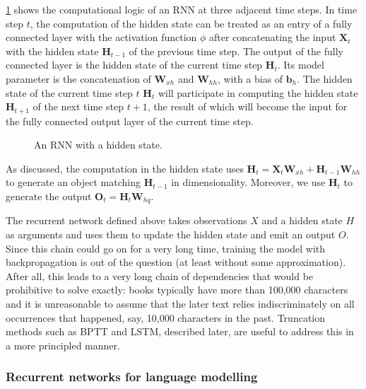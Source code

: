 \cref{fig:rnn} shows the computational logic of an RNN at three adjacent time steps. In time step $t$, the computation of the hidden state can be treated as an entry of a fully connected layer with the activation function $\phi$ after concatenating the input $\mathbf{X}_t$ with the hidden state $\mathbf{H}_{t-1}$ of the previous time step.  The output of the fully connected layer is the hidden state of the current time step $\mathbf{H}_t$. Its model parameter is the concatenation of $\mathbf{W}_{xh}$ and $\mathbf{W}_{hh}$, with a bias of $\mathbf{b}_h$. The hidden state of the current time step $t$ $\mathbf{H}_t$ will participate in computing the hidden state $\mathbf{H}_{t+1}$ of the next time step $t+1$, the result of which will become the input for the fully connected output layer of the current time step.

\begin{figure}[hpt]
    \centering
    
    \caption{An RNN with a hidden state.}
    \label{fig:rnn}
\end{figure}

As discussed, the computation in the hidden state uses $\mathbf{H}_t = \mathbf{X}_t \mathbf{W}_{xh} + \mathbf{H}_{t-1} \mathbf{W}_{hh}$ to generate an object matching $\mathbf{H}_{t-1}$ in dimensionality. Moreover, we use $\mathbf{H}_t$ to generate the output $\mathbf{O}_t = \mathbf{H}_t \mathbf{W}_{hq}$.

The recurrent network defined above takes observations $X$ and a hidden state $H$ as arguments and uses them to update the hidden state and emit an output $O$. Since this chain could go on for a very long time, training the model with backpropagation is out of the question (at least without some approximation). After all, this leads to a very long chain of dependencies that would be prohibitive to solve exactly: books typically have more than 100,000 characters and it is unreasonable to assume that the later text relies indiscriminately on all occurrences that happened, say, 10,000 characters in the past. Truncation methods such as BPTT and LSTM, described later, are useful to address this in a more principled manner. 

\subsubsection{Recurrent networks for language modelling}\label{subsubsec:rnn_lang_modelling}

